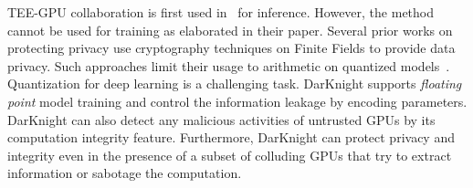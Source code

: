 TEE-GPU collaboration is first used in~\citep{tramer2018slalom} for inference. However, the method cannot be used for training as elaborated in their paper. Several prior works on protecting privacy use cryptography techniques on Finite Fields to provide data privacy. Such approaches limit their usage to arithmetic on quantized models~\citep{mohassel2017secureml,gascon2017privacy, so2019codedprivateml,wagh2019securenn, juvekar2018gazelle}. Quantization for deep learning is a challenging task. DarKnight supports \emph{floating point} model training and control the information leakage by encoding parameters. DarKnight can also detect any malicious activities of untrusted GPUs by its computation integrity feature. Furthermore, DarKnight can protect privacy and integrity even in the presence of a subset of colluding GPUs that try to extract information or sabotage the computation. 

